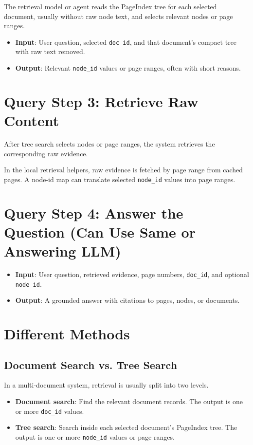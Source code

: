 \documentclass[11pt,a4paper]{article}
\newcommand{\fieldname}[1]{\textcolor{red!70!black}{\texttt{#1}}}
\begin{document}
The retrieval model or agent reads the PageIndex tree for each selected document, usually without raw node text, and selects relevant nodes or page ranges.

\begin{itemize}
    \item \textbf{Input}: User question, selected \fieldname{doc\_id}, and that document's compact tree with raw text removed.
    \item \textbf{Output}: Relevant \fieldname{node\_id} values or page ranges, often with short reasons.
\end{itemize}

\section{Query Step 3: Retrieve Raw Content}

After tree search selects nodes or page ranges, the system retrieves the corresponding raw evidence.
\par In the local retrieval helpers, raw evidence is fetched by page range from cached pages. A node-id map can translate selected \fieldname{node\_id} values into page ranges.

\section{Query Step 4: Answer the Question (Can Use Same or Answering LLM)}

\begin{itemize}
    \item \textbf{Input}: User question, retrieved evidence, page numbers, \fieldname{doc\_id}, and optional \fieldname{node\_id}.
    \item \textbf{Output}: A grounded answer with citations to pages, nodes, or documents.
\end{itemize}


\section{Different Methods}

\subsection{Document Search vs. Tree Search}

In a multi-document system, retrieval is usually split into two levels.

\begin{itemize}
    \item \textbf{Document search}: Find the relevant document records. The output is one or more \fieldname{doc\_id} values.
    \item \textbf{Tree search}: Search inside each selected document's PageIndex tree. The output is one or more \fieldname{node\_id} values or page ranges.
\end{itemize}
\end{document}

